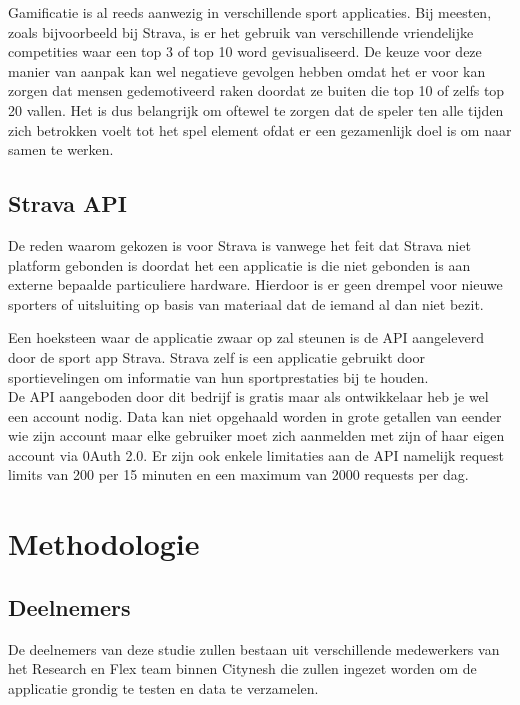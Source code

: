 Gamificatie is al reeds aanwezig in verschillende sport applicaties. Bij meesten, zoals bijvoorbeeld bij Strava, is er het gebruik van verschillende vriendelijke competities waar een top 3 of top 10 word gevisualiseerd. De keuze voor deze manier van aanpak kan wel negatieve gevolgen hebben omdat het er voor kan zorgen dat mensen gedemotiveerd raken doordat ze buiten die top 10 of zelfs top 20 vallen. \autocite{Alen2020} Het is dus belangrijk om oftewel te zorgen dat de speler ten alle tijden zich betrokken voelt tot het spel element ofdat er een gezamenlijk doel is om naar samen te werken.

\subsection{Strava API}

De reden waarom gekozen is voor Strava is vanwege het feit dat Strava niet platform gebonden is doordat het een applicatie is die niet gebonden is aan externe bepaalde particuliere hardware. \autocite{David2023} Hierdoor is er geen drempel voor nieuwe sporters of uitsluiting op basis van materiaal dat de iemand al dan niet bezit. 

Een hoeksteen waar de applicatie zwaar op zal steunen is de API aangeleverd door de sport app Strava. Strava zelf is een applicatie gebruikt door sportievelingen om informatie van hun sportprestaties bij te houden. \\

De API aangeboden door dit bedrijf is gratis maar als ontwikkelaar heb je wel een account nodig. Data kan niet opgehaald worden in grote getallen van eender wie zijn account maar elke gebruiker moet zich aanmelden met zijn of haar eigen account via 0Auth 2.0. Er zijn ook enkele limitaties aan de API namelijk request limits van 200 per 15 minuten en een maximum van 2000 requests per dag. \autocite{Strava2023}

\section{Methodologie}%
\label{sec:methodologie}

\subsection{Deelnemers}

De deelnemers van deze studie zullen bestaan uit verschillende medewerkers van het Research en Flex team binnen Citynesh die zullen ingezet worden om de applicatie grondig te testen en data te verzamelen.

